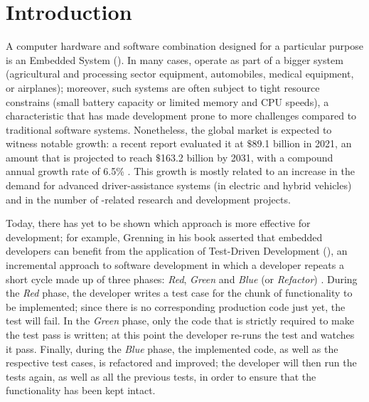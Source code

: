 \chapter{Introduction}
\label{chap:1_introduction}
A computer hardware and software combination designed for a particular purpose is an Embedded System (\es). In many cases, \ess operate as part of a bigger system (\eg  agricultural and processing sector equipment, automobiles, medical equipment, or airplanes); moreover, such systems are often subject to tight resource constrains (\eg small battery capacity or limited memory and CPU speeds), a characteristic that has made \es development prone to more challenges compared to traditional software systems.
Nonetheless, the global \ess market is expected to witness notable growth: a recent report evaluated it at $\$$89.1 billion in 2021, an amount that is projected to reach $\$$163.2 billion by 2031, with a compound annual growth rate of 6.5\% \cite{ESSTR2022}. This growth is mostly related to an increase in the demand for advanced driver-assistance systems (in electric and hybrid vehicles) and in the number of \ess-related research and development projects.  

Today, there has yet to be shown which approach is more effective for \ess development; for example, Grenning \cite{TDDEC} in his book asserted that embedded developers can benefit from the application of Test-Driven Development (\tdd), an incremental approach to software development in which a developer repeats a short cycle made up of three phases: \textit{Red}, \textit{Green} and \textit{Blue} (or \textit{Refactor}) \cite{TDDByExample}. 
During the \textit{Red} phase, the developer writes a test case for the chunk of functionality to be implemented; since there is no corresponding production code just yet, the test will fail. 
In the \textit{Green} phase, only the code that is strictly required to make the test pass is written; at this point the developer re-runs the test and watches it pass.
Finally, during the \textit{Blue} phase, the implemented code, as well as the respective test cases, is refactored and improved; the developer will then run the tests again, as well as all the previous tests, in order to ensure that the functionality has been kept intact.

